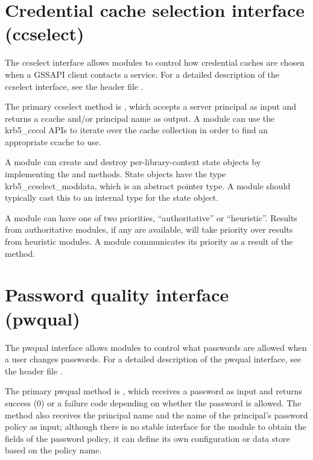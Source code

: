 \documentclass[letterpaper,10pt,english]{sphinxmanual}
\begin{document}
\section{Credential cache selection interface (ccselect)}
\label{\detokenize{plugindev/ccselect:credential-cache-selection-interface-ccselect}}\label{\detokenize{plugindev/ccselect::doc}}\label{\detokenize{plugindev/ccselect:ccselect-plugin}}
The ccselect interface allows modules to control how credential caches
are chosen when a GSSAPI client contacts a service.  For a detailed
description of the ccselect interface, see the header file
.

The primary ccselect method is , which accepts a server
principal as input and returns a ccache and/or principal name as
output.  A module can use the krb5\_cccol APIs to iterate over the
cache collection in order to find an appropriate ccache to use.

A module can create and destroy per-library-context state objects by
implementing the  and  methods.  State objects have
the type krb5\_ccselect\_moddata, which is an abstract pointer type.  A
module should typically cast this to an internal type for the state
object.

A module can have one of two priorities, “authoritative” or
“heuristic”.  Results from authoritative modules, if any are
available, will take priority over results from heuristic modules.  A
module communicates its priority as a result of the  method.


\section{Password quality interface (pwqual)}
\label{\detokenize{plugindev/pwqual::doc}}\label{\detokenize{plugindev/pwqual:password-quality-interface-pwqual}}\label{\detokenize{plugindev/pwqual:pwqual-plugin}}
The pwqual interface allows modules to control what passwords are
allowed when a user changes passwords.  For a detailed description of
the pwqual interface, see the header file .

The primary pwqual method is , which receives a password as
input and returns success (0) or a  failure code
depending on whether the password is allowed.  The  method
also receives the principal name and the name of the principal’s
password policy as input; although there is no stable interface for
the module to obtain the fields of the password policy, it can define
its own configuration or data store based on the policy name.
\end{document}

